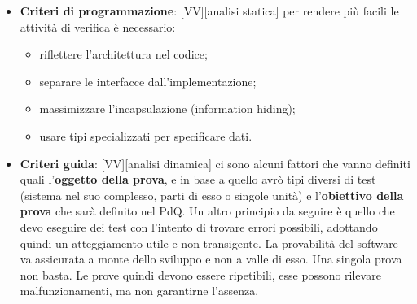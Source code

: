 \begin{itemize}
		\item \textbf{Criteri di programmazione}: [VV][analisi statica] per rendere più facili le attività di verifica è necessario:
			\begin{itemize}
				\item riflettere l'architettura nel codice;
				\item separare le interfacce dall'implementazione;
				\item massimizzare l'incapsulazione (information hiding);
				\item usare tipi specializzati per specificare dati. 
			\end{itemize}

		\item \textbf{Criteri guida}: [VV][analisi dinamica] ci sono alcuni fattori che vanno definiti quali l'\textbf{oggetto della prova}, e in base a quello avrò tipi diversi di test (sistema nel suo complesso, parti di esso o singole unità) e l'\textbf{obiettivo della prova} che sarà definito nel PdQ. Un altro principio da seguire è quello che devo eseguire dei test con l'intento di trovare errori possibili, adottando quindi un atteggiamento utile e non transigente. La provabilità del software va assicurata a monte dello sviluppo e non a valle di esso. Una singola prova non basta. Le prove quindi devono essere ripetibili, esse possono rilevare malfunzionamenti, ma non garantirne l'assenza.

	\end{itemize}